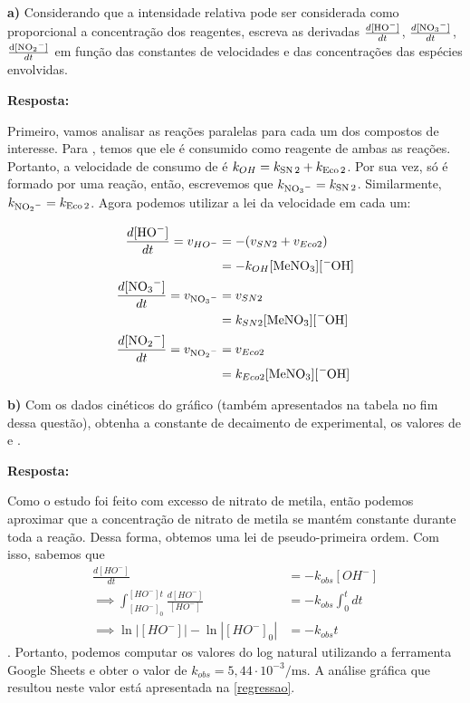 \textbf{a)} Considerando que a intensidade relativa pode ser considerada como proporcional a concentração dos reagentes, escreva as derivadas \(\frac{d \ce{[HO^-]}}{dt}\), \(\frac{d \ce{[NO3^-]}}{dt}\), \(\frac{ \ce{d[NO2^-]}}{dt}\) em função das constantes de velocidades e das concentrações das espécies envolvidas.

\textbf{Resposta:}

Primeiro, vamos analisar as reações paralelas para cada um dos compostos de interesse. Para , temos que ele é consumido como reagente de ambas as reações. Portanto, a velocidade de consumo de  é \(k_{OH} = k_{ \ce{SN 2}} + k_{\ce{Eco 2}}\). Por sua vez,  só é formado por uma reação, então, escrevemos que \(k_{\ce{NO3^-}} = k_{\ce{SN 2}}\). Similarmente, \(k_{\ce{NO2^-}} = k_{\ce{Eco 2}}\). Agora podemos utilizar a lei da velocidade em cada um:

\begin{align*}
    \frac{d \ce{[HO^-]}}{dt} = v_{HO^-} &= - (v_{SN2} + v_{Eco2})\\
                                        &= - k_{OH}[\ce{MeNO3}][\ce{^-OH}]\\
    \frac{d \ce{[NO3^-]}}{dt} = v_{\ce{NO3^-}} &= v_{SN2}\\
                                               &= k_{SN2}[\ce{MeNO3}][\ce{^-OH}]\\
    \frac{d \ce{[NO2^-]}}{dt} = v_{\ce{NO2^-}} &= v_{Eco2}\\
                                               &= k_{Eco2}[\ce{MeNO3}][\ce{^-OH}]
\end{align*}

\commentspace

\textbf{b)} Com os dados cinéticos do gráfico (também apresentados na tabela no fim dessa questão), obtenha a constante de decaimento de  experimental, os valores de  e .

\textbf{Resposta:}

Como o estudo foi feito com excesso de nitrato de metila, então podemos aproximar que a concentração de nitrato de metila se mantém constante durante toda a reação. Dessa forma, obtemos uma lei de pseudo-primeira ordem. Com isso, sabemos que
\begin{align*}
    \frac{d [HO^-]}{dt} &= -k_{obs} [OH^-] \\
    \implies \int_{[HO^-]_0}^{[HO^-]t} \frac{d[HO^-]}{[HO^-]} &= -k_{obs} \int_0^t dt \\
    \implies \ln |[HO^-]| - \ln|{[HO^-]}_0| &= -k_{obs} t
\end{align*}
. Portanto, podemos computar os valores do log natural utilizando a ferramenta Google Sheets e obter o valor de \(k_{obs} = 5,44 \cdot 10^{-3} \si{\per \milli \second}\). A análise gráfica que resultou neste valor está apresentada na \cref{regressao}.

